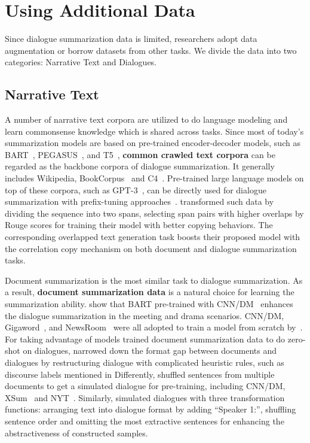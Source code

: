 \section{Using Additional Data}\label{sec:useadddata}

Since dialogue summarization data is limited, researchers 
adopt data augmentation or borrow datasets from other tasks. 
We divide the data into two categories: 
Narrative Text and Dialogues.

\subsection{Narrative Text}

A number of {narrative text corpora} are utilized to do language modeling and learn commonsense knowledge which is shared across tasks.
Since most of today's summarization models are based on pre-trained encoder-decoder models, such as BART~\cite{lewis2020bart}, PEGASUS~\cite{zhang2020pegasus}, and T5~\cite{raffel2020exploring},  \textbf{common crawled text corpora} can be regarded as the backbone corpora of dialogue summarization. It generally includes Wikipedia, BookCorpus~\cite{zhu2015aligning} and 
C4~\cite{raffel2020exploring}. 
Pre-trained large language models on top of these corpora, such as GPT-3~\cite{brown2020language}, can be directly used for dialogue summarization with prefix-tuning approaches~\cite{prodan2021prompt}.
\citet{li2021learn} transformed such data by dividing the sequence 
into two spans, selecting span pairs with higher overlaps by Rouge scores for training their model with better copying behaviors.
The corresponding overlapped text generation task boosts their proposed model with the correlation copy mechanism on both document and dialogue summarization tasks.

Document summarization is the most similar task to dialogue summarization. As a result, \textbf{document summarization data} is a natural choice for learning the summarization ability.
\citet{zhang2021exploratory} show that BART pre-trained with 
CNN/DM~\cite{hermann2015teaching}
enhances the dialogue summarization in the meeting and drama scenarios.
CNN/DM, Gigaword~\cite{rush2015neural}, and 
NewsRoom~\cite{grusky2018newsroom} were all adopted to train a model from scratch by~\citet{zou2021low}.
For taking advantage of models trained document summarization data to do zero-shot on dialogues, \citet{ganesh2019restructuring} narrowed down the format gap between documents and dialogues by restructuring dialogue with complicated heuristic rules, such as discourse labels mentioned in 
Differently, \citet{zhu2020end} shuffled sentences from multiple 
documents to get a simulated dialogue for pre-training, including 
CNN/DM, XSum~\cite{narayan2018don} and NYT~\cite{evan2008nyt}.
Similarly, \citet{park2022leveraging} simulated dialogues with three transformation functions: arranging text into dialogue format by adding ``Speaker 1:'', shuffling sentence order and omitting the most extractive sentences for enhancing the abstractiveness of constructed samples.


